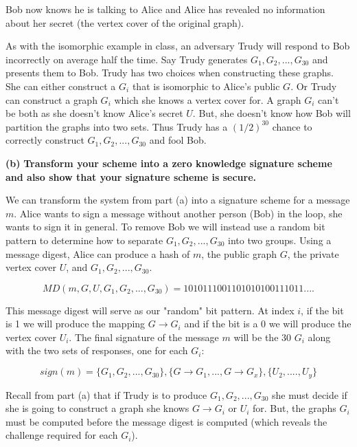 \documentclass[11pt]{article}
\renewcommand\part[1]{\vspace{.10in}\textbf{(#1)}}
\begin{document}
Bob now knows he is talking to Alice and Alice has revealed no information about her secret (the vertex cover of the original graph).

As with the isomorphic example in class, an adversary Trudy will respond to Bob incorrectly on average half the time. Say Trudy generates $G_1, G_2, ..., G_{30}$ and presents them to Bob. Trudy has two choices when constructing these graphs. She can either construct a $G_i$ that is isomorphic to Alice's public $G$. Or Trudy can construct a graph $G_i$ which she knows a vertex cover for. A graph $G_i$ can't be both as she doesn't know Alice's secret $U$. But, she doesn't know how Bob will partition the graphs into two sets. Thus Trudy has a $(1/2)^{30}$ chance to correctly construct $G_1, G_2, ..., G_{30}$ and fool Bob.

\part{b} \textbf{Transform your scheme into a zero knowledge signature scheme and also show that your signature scheme is secure.}

We can transform the system from part (a) into a signature scheme for a message $m$. Alice wants to sign a message without another person (Bob) in the loop, she wants to sign it in general. To remove Bob we will instead use a random bit pattern to determine how to separate $G_1, G_2, ..., G_{30}$ into two groups. Using a message digest, Alice can produce a hash of $m$, the public graph $G$, the private vertex cover $U$, and $G_1, G_2, ..., G_{30}$.

$$MD(m, G, U, G_1, G_2, ..., G_{30}) = 1010111001101010100111011....$$

This message digest will serve as our "random" bit pattern. At index $i$, if the bit is 1 we will produce the mapping $G \rightarrow G_i$ and if the bit is a 0 we will produce the vertex cover $U_i$. The final signature of the message $m$ will be the $30$ $G_i$ along with the two sets of responses, one for each $G_i$:

$$sign(m) = \{G_1, G_2, ..., G_{30}\}, \{G \rightarrow G_1, ..., G \rightarrow G_x\}, \{U_2, ...., U_y\}$$

Recall from part (a) that if Trudy is to produce $G_1, G_2, ..., G_{30}$ she must decide if she is going to construct a graph she knows $G \rightarrow G_i$ or $U_i$ for. But, the graphs $G_i$ must be computed before the message digest is computed (which reveals the challenge required for each $G_i$). 
\end{document}
